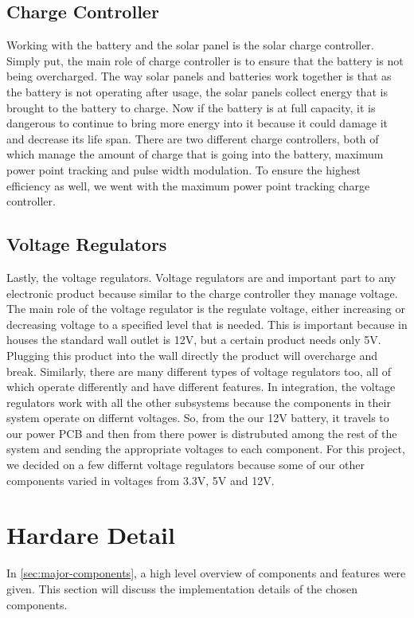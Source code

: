 \documentclass[journal]{IEEEtran}
\begin{document}
\subsection{Charge Controller} \label{sec:charge controller}
Working with the battery and the solar panel is the solar charge controller. Simply put, the main role of 
charge controller is to ensure that the battery is not being overcharged. The way solar panels and batteries 
work together is that as the battery is not operating after usage, the solar panels collect energy that 
is brought to the battery to charge. Now if the battery is at full capacity, it is dangerous to continue 
to bring more energy into it because it could damage it and decrease its life span. There are two different 
charge controllers, both of which manage the amount of charge that is going into the battery, maximum power 
point tracking and pulse width modulation. To ensure the highest efficiency as well, we went with the 
maximum power point tracking charge controller.
\subsection{Voltage Regulators} \label{sec:voltage regulator}
Lastly, the voltage regulators. Voltage regulators are and important part to any electronic product because 
similar to the charge controller they manage voltage. The main role of the voltage regulator is the regulate 
voltage, either increasing or decreasing voltage to a specified level that is needed. This is important 
because in houses the standard wall outlet is 12V, but a certain product needs only 5V. Plugging this product 
into the wall directly the product will overcharge and break. Similarly, there are many different types of 
voltage regulators too, all of which operate differently and have different features. In integration, the 
voltage regulators work with all the other subsystems because the components in their system operate on 
differnt voltages. So, from the our 12V battery, it travels to our power PCB and then from there power is 
distrubuted among the rest of the system and sending the appropriate voltages to each component. For this 
project, we decided on a few differnt voltage regulators because some of our other components varied in 
voltages from 3.3V, 5V and 12V. 

\section{Hardare Detail}
In \autoref{sec:major-components}, a high level overview of components and features were given. This
section will discuss the implementation details of the chosen components.
\end{document}

